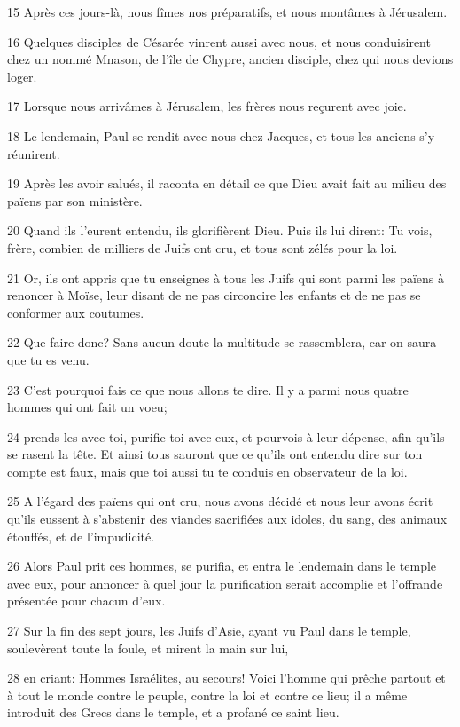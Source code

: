 \par 15 Après ces jours-là, nous fîmes nos préparatifs, et nous montâmes à Jérusalem.
\par 16 Quelques disciples de Césarée vinrent aussi avec nous, et nous conduisirent chez un nommé Mnason, de l'île de Chypre, ancien disciple, chez qui nous devions loger.
\par 17 Lorsque nous arrivâmes à Jérusalem, les frères nous reçurent avec joie.
\par 18 Le lendemain, Paul se rendit avec nous chez Jacques, et tous les anciens s'y réunirent.
\par 19 Après les avoir salués, il raconta en détail ce que Dieu avait fait au milieu des païens par son ministère.
\par 20 Quand ils l'eurent entendu, ils glorifièrent Dieu. Puis ils lui dirent: Tu vois, frère, combien de milliers de Juifs ont cru, et tous sont zélés pour la loi.
\par 21 Or, ils ont appris que tu enseignes à tous les Juifs qui sont parmi les païens à renoncer à Moïse, leur disant de ne pas circoncire les enfants et de ne pas se conformer aux coutumes.
\par 22 Que faire donc? Sans aucun doute la multitude se rassemblera, car on saura que tu es venu.
\par 23 C'est pourquoi fais ce que nous allons te dire. Il y a parmi nous quatre hommes qui ont fait un voeu;
\par 24 prends-les avec toi, purifie-toi avec eux, et pourvois à leur dépense, afin qu'ils se rasent la tête. Et ainsi tous sauront que ce qu'ils ont entendu dire sur ton compte est faux, mais que toi aussi tu te conduis en observateur de la loi.
\par 25 A l'égard des païens qui ont cru, nous avons décidé et nous leur avons écrit qu'ils eussent à s'abstenir des viandes sacrifiées aux idoles, du sang, des animaux étouffés, et de l'impudicité.
\par 26 Alors Paul prit ces hommes, se purifia, et entra le lendemain dans le temple avec eux, pour annoncer à quel jour la purification serait accomplie et l'offrande présentée pour chacun d'eux.
\par 27 Sur la fin des sept jours, les Juifs d'Asie, ayant vu Paul dans le temple, soulevèrent toute la foule, et mirent la main sur lui,
\par 28 en criant: Hommes Israélites, au secours! Voici l'homme qui prêche partout et à tout le monde contre le peuple, contre la loi et contre ce lieu; il a même introduit des Grecs dans le temple, et a profané ce saint lieu.
